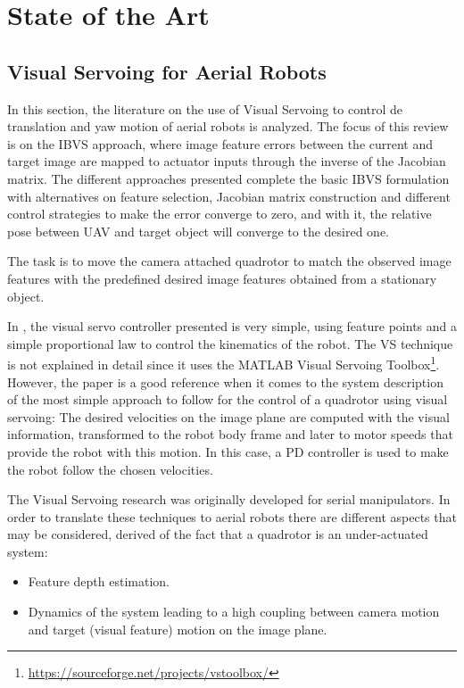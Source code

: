 \section{State of the Art}

\subsection{Visual Servoing for Aerial Robots}

In this section, the literature on the use of Visual Servoing to control de translation and yaw motion of aerial robots is analyzed. The focus of this review is on the IBVS approach, where image feature errors between the current and target image are mapped to actuator inputs through the inverse of the Jacobian matrix. The different approaches presented complete the basic IBVS formulation with alternatives on feature selection, Jacobian matrix construction and different control strategies to make the error converge to zero, and with it, the relative pose between UAV and target object will converge to the desired one.

The task is to move the camera attached quadrotor to match the observed image features with the predefined desired image features obtained from a stationary object.

In \cite{ceren_vision-based_2009}, the visual servo controller presented is very simple, using feature points and a simple proportional law to control the kinematics of the robot. The VS technique is not explained in detail since it uses the MATLAB Visual Servoing Toolbox\footnote{\url{https://sourceforge.net/projects/vstoolbox/}}. However, the paper is a good reference when it comes to the system description of the most simple approach to follow for the control of a quadrotor using visual servoing: The desired velocities on the image plane are computed with the visual information, transformed to the robot body frame and later to motor speeds that provide the robot with this motion. In this case, a PD controller is used to make the robot follow the chosen velocities. 


The Visual Servoing research was originally developed for serial manipulators. In order to translate these techniques to aerial robots there are different aspects that may be considered, derived of the fact that a quadrotor is an under-actuated system:

\begin{itemize}
	\item Feature depth estimation.
	\item Dynamics of the system leading to a high coupling between camera motion and target (visual feature) motion on the image plane.
\end{itemize}

